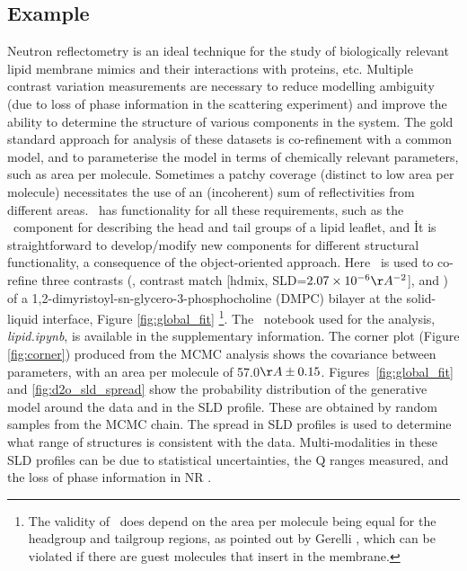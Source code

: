\documentclass[12pt]{article}
\begin{document}
\subsection*{Example}
Neutron reflectometry is an ideal technique for the study of biologically relevant lipid membrane mimics and their interactions with proteins, etc. Multiple contrast variation measurements are necessary to reduce modelling ambiguity (due to loss of phase information in the scattering experiment) and improve the ability to determine the structure of various components in the system. The gold standard approach for analysis of these datasets is co-refinement with a common model, and to parameterise the model in terms of chemically relevant parameters, such as area per molecule. Sometimes a patchy coverage (distinct to low area per molecule) necessitates the use of an (incoherent) sum of reflectivities from different areas. \ has functionality for all these requirements, such as the \LipidLeaflet\ component for describing the head and tail groups of a lipid leaflet, and \MixedReflectModel\. It is straightforward to develop/modify new components for different structural functionality, a consequence of the object-oriented approach. 
Here \LipidLeaflet\ is used to co-refine three contrasts (,  contrast match [hdmix, SLD=$2.07\times10^{-6}\AA^{-2}$], and ) of a 1,2-dimyristoyl-sn-glycero-3-phosphocholine (DMPC) bilayer at the solid-liquid interface, Figure \ref{fig:global_fit} \footnote{The validity of \LipidLeaflet\ does depend on the area per molecule being equal for the headgroup and tailgroup regions, as pointed out by Gerelli \cite{Gerelli2016}, which can be violated if there are guest molecules that insert in the membrane.}. The \Jupyter\ notebook used for the analysis, \emph{lipid.ipynb}, is available in the supplementary information. The corner plot (Figure \ref{fig:corner}) produced from the MCMC analysis shows the covariance between parameters, with an area per molecule of 57.0$\AA\pm0.15$. Figures~\ref{fig:global_fit} and \ref{fig:d2o_sld_spread} show the probability distribution of the generative model around the data and in the SLD profile. These are obtained by random samples from the MCMC chain. The spread in SLD profiles is used to determine what range of structures is consistent with the data. Multi-modalities in these SLD profiles can be due to statistical uncertainties, the Q ranges measured, and the loss of phase information in NR \cite{Majkrzak1999, Heinrich2009}.
\end{document}
